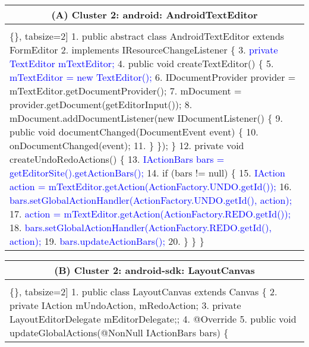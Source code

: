 \begin{figure*}[!htb]
 \begin{minipage}{0.5\textwidth}
\scriptsize 
\begin{tabular}{@{}p{}} 
 \hline 
  \multicolumn{1}{c}{(A) Cluster 2: android: AndroidTextEditor} \\ \hline
  \vspace{-4mm}
\begin{Verbatim}[commandchars=\\\{\}, tabsize=2]
1. public abstract class AndroidTextEditor extends FormEditor
2.    implements IResourceChangeListener \{
3. \textcolor{blue}{   private TextEditor mTextEditor;}
4.  public void createTextEditor() \{
5. \textcolor{blue}{   mTextEditor = new TextEditor();}
6.    IDocumentProvider provider = mTextEditor.getDocumentProvider();
7.    mDocument = provider.getDocument(getEditorInput());
8.    mDocument.addDocumentListener(new IDocumentListener() \{
9.      public void documentChanged(DocumentEvent event) \{
10.        onDocumentChanged(event);
11.      \}  \});  \}
12. private void createUndoRedoActions() \{
13.\textcolor{blue}{ IActionBars bars = getEditorSite().getActionBars();}
14.  if (bars != null) \{
15.\textcolor{blue}{  IAction action = mTextEditor.getAction(ActionFactory.UNDO.getId());}
16.\textcolor{blue}{  bars.setGlobalActionHandler(ActionFactory.UNDO.getId(), action);}
17.\textcolor{blue}{  action = mTextEditor.getAction(ActionFactory.REDO.getId());}
18.\textcolor{blue}{  bars.setGlobalActionHandler(ActionFactory.REDO.getId(), action);}
19.\textcolor{blue}{  bars.updateActionBars();}
20.        \}  \}    \} 
  \end{Verbatim}
      \vspace{-4mm}
     \\     
\end{tabular} 
\end{minipage}
 \begin{minipage}{0.5\textwidth}
\scriptsize 
\begin{tabular}{@{}p{}} 
 \hline 
  \multicolumn{1}{c}{(B) Cluster 2: android-sdk: LayoutCanvas} \\ \hline
  \vspace{-4mm}
\begin{Verbatim}[commandchars=\\\{\}, tabsize=2]
1. public class LayoutCanvas extends Canvas \{
2.    private IAction mUndoAction, mRedoAction;
3.    private LayoutEditorDelegate mEditorDelegate;;
4.   @Override
5.    public void updateGlobalActions(@NonNull IActionBars bars) \{   

\end{Verbatim}
\end{tabular}
\end{minipage}
\end{figure*}
